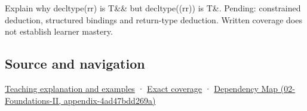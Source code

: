 Explain why decltype(rr) is T\&\& but decltype((rr)) is T\&. Pending: constrained deduction, structured bindings and return-type deduction. Written coverage does not establish learner mastery.

\subsection{Source and navigation}\label{appendix-5d4252a42886-source-and-navigation}

\hyperref[01-foundations-i-ch003-an-expression-has-a-type-and-a-category]{Teaching explanation and examples} · \hyperref[appendix-fd090d982a15-m008---parts-113-126]{Exact coverage} · \href{../02-Foundations-II/main.pdf\#nameddest=appendix-4ad47bdd269a}{Dependency Map (02-Foundations-II, appendix-4ad47bdd269a)}
